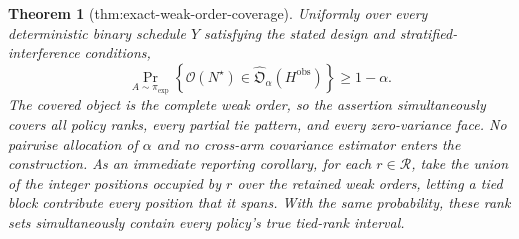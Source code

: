 \documentclass{article}
\newtheorem{theorem}{Theorem}
\begin{document}
\begin{theorem}[thm:exact-weak-order-coverage]\label{thm:exact-weak-order-coverage}
Uniformly over every deterministic binary schedule \(Y\) satisfying the stated design and stratified-interference conditions, \[\Pr_{A\sim\pi_{\exp}}\left\{\mathcal O(N^\star)\in\widehat{\mathfrak O}_{\alpha}(H^{\mathrm{obs}})\right\}\ge 1-\alpha.\] The covered object is the complete weak order, so the assertion simultaneously covers all policy ranks, every partial tie pattern, and every zero-variance face. No pairwise allocation of \(\alpha\) and no cross-arm covariance estimator enters the construction. As an immediate reporting corollary, for each \(r\in\mathcal R\), take the union of the integer positions occupied by \(r\) over the retained weak orders, letting a tied block contribute every position that it spans. With the same probability, these rank sets simultaneously contain every policy's true tied-rank interval.
\end{theorem}
\end{document}
